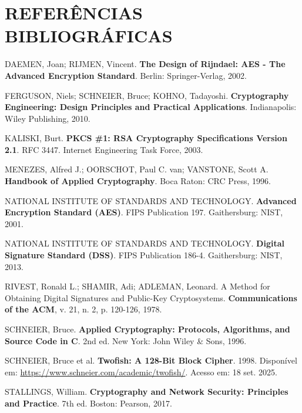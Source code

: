 \documentclass[12pt,a4paper,oneside]{article}
\begin{document}
\section{REFERÊNCIAS BIBLIOGRÁFICAS}

DAEMEN, Joan; RIJMEN, Vincent. \textbf{The Design of Rijndael: AES - The Advanced Encryption Standard}. Berlin: Springer-Verlag, 2002.

FERGUSON, Niels; SCHNEIER, Bruce; KOHNO, Tadayoshi. \textbf{Cryptography Engineering: Design Principles and Practical Applications}. Indianapolis: Wiley Publishing, 2010.

KALISKI, Burt. \textbf{PKCS \#1: RSA Cryptography Specifications Version 2.1}. RFC 3447. Internet Engineering Task Force, 2003.

MENEZES, Alfred J.; OORSCHOT, Paul C. van; VANSTONE, Scott A. \textbf{Handbook of Applied Cryptography}. Boca Raton: CRC Press, 1996.

NATIONAL INSTITUTE OF STANDARDS AND TECHNOLOGY. \textbf{Advanced Encryption Standard (AES)}. FIPS Publication 197. Gaithersburg: NIST, 2001.

NATIONAL INSTITUTE OF STANDARDS AND TECHNOLOGY. \textbf{Digital Signature Standard (DSS)}. FIPS Publication 186-4. Gaithersburg: NIST, 2013.

RIVEST, Ronald L.; SHAMIR, Adi; ADLEMAN, Leonard. A Method for Obtaining Digital Signatures and Public-Key Cryptosystems. \textbf{Communications of the ACM}, v. 21, n. 2, p. 120-126, 1978.

SCHNEIER, Bruce. \textbf{Applied Cryptography: Protocols, Algorithms, and Source Code in C}. 2nd ed. New York: John Wiley \& Sons, 1996.

SCHNEIER, Bruce et al. \textbf{Twofish: A 128-Bit Block Cipher}. 1998. Disponível em: \url{https://www.schneier.com/academic/twofish/}. Acesso em: 18 set. 2025.

STALLINGS, William. \textbf{Cryptography and Network Security: Principles and Practice}. 7th ed. Boston: Pearson, 2017.
\end{document}

